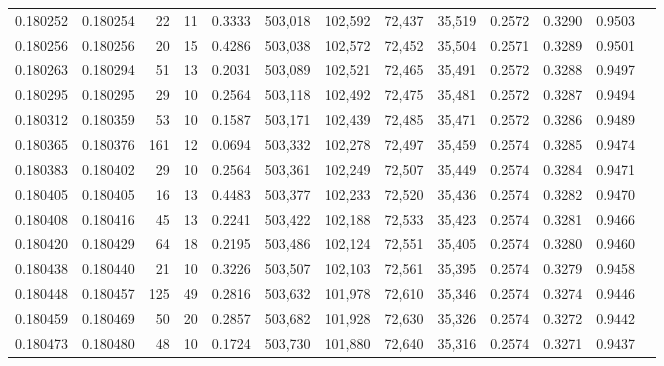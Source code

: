 \begin{tabular}{rrrrrrrrrrrrr}
0.180252 & 0.180254 &    22 &  11 &                                     0.3333 & 503,018 & 102,592 &  72,437 &  35,519 & 0.2572 & 0.3290 & 0.9503 \\
0.180256 & 0.180256 &    20 &  15 &                                     0.4286 & 503,038 & 102,572 &  72,452 &  35,504 & 0.2571 & 0.3289 & 0.9501 \\
0.180263 & 0.180294 &    51 &  13 &                                     0.2031 & 503,089 & 102,521 &  72,465 &  35,491 & 0.2572 & 0.3288 & 0.9497 \\
0.180295 & 0.180295 &    29 &  10 &                                     0.2564 & 503,118 & 102,492 &  72,475 &  35,481 & 0.2572 & 0.3287 & 0.9494 \\
0.180312 & 0.180359 &    53 &  10 &                                     0.1587 & 503,171 & 102,439 &  72,485 &  35,471 & 0.2572 & 0.3286 & 0.9489 \\
0.180365 & 0.180376 &   161 &  12 &                                     0.0694 & 503,332 & 102,278 &  72,497 &  35,459 & 0.2574 & 0.3285 & 0.9474 \\
0.180383 & 0.180402 &    29 &  10 &                                     0.2564 & 503,361 & 102,249 &  72,507 &  35,449 & 0.2574 & 0.3284 & 0.9471 \\
0.180405 & 0.180405 &    16 &  13 &                                     0.4483 & 503,377 & 102,233 &  72,520 &  35,436 & 0.2574 & 0.3282 & 0.9470 \\
0.180408 & 0.180416 &    45 &  13 &                                     0.2241 & 503,422 & 102,188 &  72,533 &  35,423 & 0.2574 & 0.3281 & 0.9466 \\
0.180420 & 0.180429 &    64 &  18 &                                     0.2195 & 503,486 & 102,124 &  72,551 &  35,405 & 0.2574 & 0.3280 & 0.9460 \\
0.180438 & 0.180440 &    21 &  10 &                                     0.3226 & 503,507 & 102,103 &  72,561 &  35,395 & 0.2574 & 0.3279 & 0.9458 \\
0.180448 & 0.180457 &   125 &  49 &                                     0.2816 & 503,632 & 101,978 &  72,610 &  35,346 & 0.2574 & 0.3274 & 0.9446 \\
0.180459 & 0.180469 &    50 &  20 &                                     0.2857 & 503,682 & 101,928 &  72,630 &  35,326 & 0.2574 & 0.3272 & 0.9442 \\
0.180473 & 0.180480 &    48 &  10 &                                     0.1724 & 503,730 & 101,880 &  72,640 &  35,316 & 0.2574 & 0.3271 & 0.9437 \\

\end{tabular}

